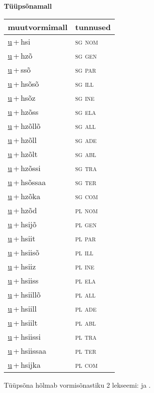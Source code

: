 
\vspace{1.8em}
\begin{minipage}{\textwidth}
\textbf{Tüüpsõnamall \,}\\

\begin{sideways}
\begin{tabular}{l l}
muutvormimall & tunnused \\
\hline
\underline{u}\,+\,hsi & \textsc{ sg nom } \\
\underline{u}\,+\,hzõ & \textsc{ sg gen } \\
\underline{u}\,+\,ssõ & \textsc{ sg par } \\
\underline{u}\,+\,hsõsõ & \textsc{ sg ill } \\
\underline{u}\,+\,hsõz & \textsc{ sg ine } \\
\underline{u}\,+\,hzõss & \textsc{ sg ela } \\
\underline{u}\,+\,hzõllõ & \textsc{ sg all } \\
\underline{u}\,+\,hzõll & \textsc{ sg ade } \\
\underline{u}\,+\,hzõlt & \textsc{ sg abl } \\
\underline{u}\,+\,hzõssi & \textsc{ sg tra } \\
\underline{u}\,+\,hsõssaa & \textsc{ sg ter } \\
\underline{u}\,+\,hzõka & \textsc{ sg com } \\
\underline{u}\,+\,hzõd & \textsc{ pl nom } \\
\underline{u}\,+\,hsijõ & \textsc{ pl gen } \\
\underline{u}\,+\,hsiit & \textsc{ pl par } \\
\underline{u}\,+\,hsiisõ & \textsc{ pl ill } \\
\underline{u}\,+\,hsiiz & \textsc{ pl ine } \\
\underline{u}\,+\,hsiiss & \textsc{ pl ela } \\
\underline{u}\,+\,hsiillõ & \textsc{ pl all } \\
\underline{u}\,+\,hsiill & \textsc{ pl ade } \\
\underline{u}\,+\,hsiilt & \textsc{ pl abl } \\
\underline{u}\,+\,hsiissi & \textsc{ pl tra } \\
\underline{u}\,+\,hsiissaa & \textsc{ pl ter } \\
\underline{u}\,+\,hsijka & \textsc{ pl com } \\
\end{tabular}
\end{sideways}
\label{tab:tüüpsõnamall-uhsi}

\end{minipage}

 
\vspace{1em}
\noindent Tüüpsõna hõlmab vormisõnastiku 2 lekseemi:  ja .
